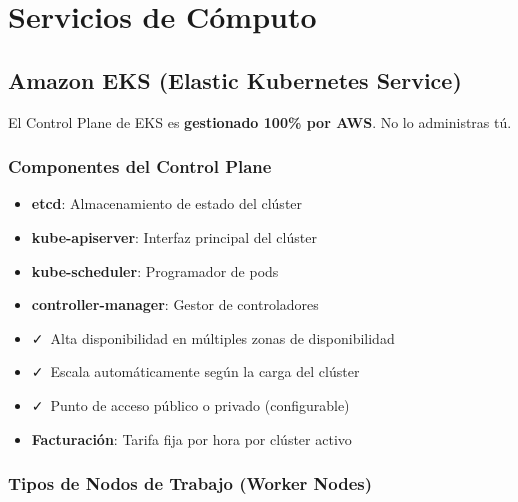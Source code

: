 \documentclass[12pt,a4paper]{report}
\newcommand{\important}[1]{\textcolor{dangerred}{\textbf{#1}}}
\newcommand{\vcheckmark}{\textcolor{successgreen}{\faCheck}}
\begin{document}
\newpage

\chapter{Servicios de Cómputo}

\section{Amazon EKS (Elastic Kubernetes Service)}

\begin{conceptbox}
El Control Plane de EKS es \important{gestionado 100\% por AWS}. No lo administras tú.
\end{conceptbox}

\subsection{Componentes del Control Plane}

\begin{itemize}[leftmargin=2cm]
    \item \textbf{etcd}: Almacenamiento de estado del clúster
    \item \textbf{kube-apiserver}: Interfaz principal del clúster
    \item \textbf{kube-scheduler}: Programador de pods
    \item \textbf{controller-manager}: Gestor de controladores
\end{itemize}

\begin{awsbox}
\begin{itemize}
    \item \vcheckmark\ Alta disponibilidad en múltiples zonas de disponibilidad
    \item \vcheckmark\ Escala automáticamente según la carga del clúster
    \item \vcheckmark\ Punto de acceso público o privado (configurable)
    \item \important{Facturación}: Tarifa fija por hora por clúster activo
\end{itemize}
\end{awsbox}

\subsection{Tipos de Nodos de Trabajo (Worker Nodes)}
\end{document}
